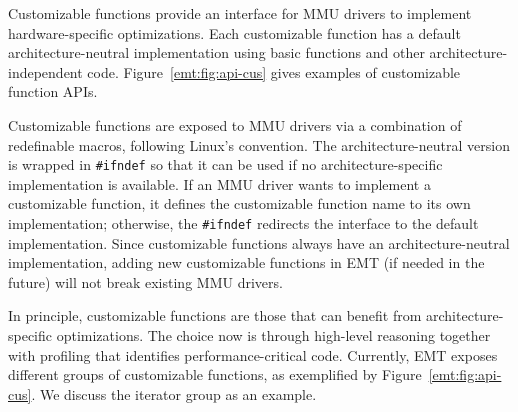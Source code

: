 \noindent
Customizable functions provide an interface for MMU drivers to implement 
	hardware-specific optimizations.
Each customizable function has a default architecture-neutral implementation
	using basic functions and other architecture-independent code.
Figure~\ref{emt:fig:api-cus} gives examples of customizable function APIs.

Customizable functions are exposed to MMU drivers via a combination of redefinable macros,
	following Linux's convention.
The architecture-neutral version is wrapped in \texttt{\small \#ifndef} 
	so that it can be used if no architecture-specific implementation is available. 
If an MMU driver wants to implement a customizable function, 
	it defines the customizable function name to its own implementation; %
	otherwise, the \texttt{\small \#ifndef} redirects the interface to the default implementation. 
Since customizable functions always have an architecture-neutral implementation, 
	adding new customizable functions in EMT (if needed in the future) will not break existing MMU drivers.

In principle, customizable functions are those that can benefit from architecture-specific optimizations. 
The choice now is through high-level reasoning together with profiling that identifies performance-critical code.
Currently, EMT exposes different groups of customizable functions,
	as exemplified by Figure~\ref{emt:fig:api-cus}.
We discuss the iterator group as an example.


